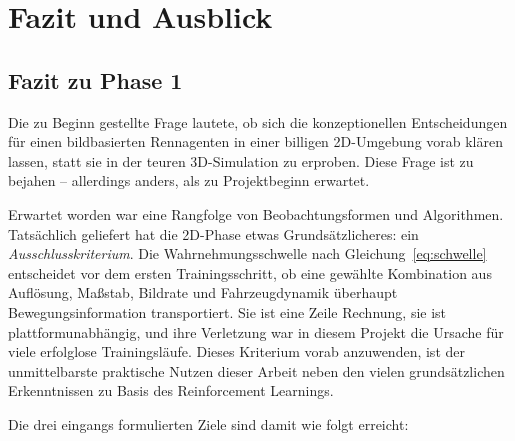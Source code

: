 \chapter{Fazit und Ausblick}
\label{chap:fazit}

\section{Fazit zu Phase 1}
\label{sec:fazit_phase1}

Die zu Beginn gestellte Frage lautete, ob sich die konzeptionellen Entscheidungen für einen bildbasierten Rennagenten in einer billigen 2D-Umgebung vorab klären lassen, statt sie in der teuren 3D-Simulation zu erproben. Diese Frage ist zu bejahen -- allerdings anders, als zu Projektbeginn erwartet.

Erwartet worden war eine Rangfolge von Beobachtungsformen und Algorithmen. Tatsächlich geliefert hat die 2D-Phase etwas Grundsätzlicheres: ein \emph{Ausschlusskriterium}. Die Wahrnehmungsschwelle nach Gleichung~\eqref{eq:schwelle} entscheidet vor dem ersten Trainingsschritt, ob eine gewählte Kombination aus Auflösung, Maßstab, Bildrate und Fahrzeugdynamik überhaupt Bewegungsinformation transportiert. Sie ist eine Zeile Rechnung, sie ist plattformunabhängig, und ihre Verletzung war in diesem Projekt die Ursache für viele erfolglose Trainingsläufe. Dieses Kriterium vorab anzuwenden, ist der unmittelbarste praktische Nutzen dieser Arbeit neben den vielen grundsätzlichen Erkenntnissen zu Basis des Reinforcement Learnings.

Die drei eingangs formulierten Ziele sind damit wie folgt erreicht:

